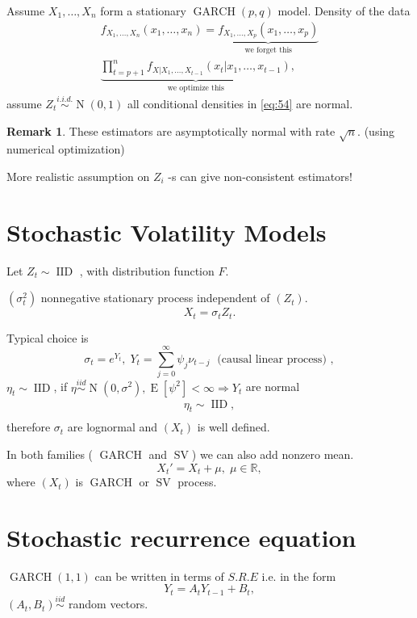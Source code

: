 \documentclass[12pt,a4paper, notitlepage]{book}
\theoremstyle{definition} %
\newtheorem{remark}[definition]{Remark}
\theoremstyle{plain} %
\newcommand{\R}{\mathbb R}
\DeclareMathOperator{\E}{E}
\DeclareMathOperator{\No}{N}
\DeclareMathOperator{\Iid}{IID}
\DeclareMathOperator{\Garch}{GARCH}
\DeclareMathOperator{\Sv}{SV}
\begin{document}
Assume $ X_1, \ldots , X_n $ form a stationary $ \Garch(p,q) $ model. Density of the data
\begin{align*}
 f_{X_1, \ldots, X_n}(x_1, \ldots , x_n) =  \underbrace{ f_{X_1, \ldots , X_p}(x_1, \ldots , x_p)}_{\text{ we forget this }  } \\
\underbrace{\prod_{t=p+1}^n f_{X|X_1, \ldots , X_{t-1}}(x_t | x_1, \ldots , x_{t-1} ) }_{\text{we optimize this}} \label{eq:54} , \end{align*}
assume $ Z_t \overset{i.i.d.}{\sim} \No(0, 1) $ all conditional densities in \ref{eq:54} are
normal.

\begin{remark}
These estimators are asymptotically normal with rate $ \sqrt{n} $. (using numerical optimization)

More realistic assumption on $ Z_i$ -s can give non-consistent estimators!
\end{remark}



\section{ Stochastic Volatility Models}
Let $ Z_t \sim \Iid $ , with distribution function $ F $.

$ (\sigma_t^2) $ nonnegative stationary process independent of $ (Z_t) $.
\[ X_t = \sigma_t Z_t . \]

Typical choice is 
\[
\sigma_t = e^{Y_t} , \; Y_t = \sum_{j=0}^{\infty} \psi _j \nu _{t-j}  \; \text{ (causal linear process) } ,
\]
$ \eta _t \sim \Iid $, if $ \eta \overset{iid}{\sim} \No(0, \sigma^2) , \E[ \psi^2] < \infty \Rightarrow Y_t $ are normal
\begin{align*}
\eta_t \sim \Iid, \\
\end{align*}
therefore $ \sigma_t $ are lognormal and $ (X_t) $ is well defined.

In both families ( $ \Garch $ and $ \Sv $) we can also add
nonzero mean.
\[ X_t' = X_t + \mu, \; \mu \in \R , \]
where $ (X_t) $ is $ \Garch $ or $ \Sv $ process.


\section{Stochastic recurrence equation}

$ \Garch(1,1) $ can be written in terms of $ S.R.E $ i.e. in the form 
\[ Y_t = A_t Y_{t-1} + B_t , \]
$ (A_t, B_t) \overset{iid}{\sim} $ random vectors.
\end{document}
